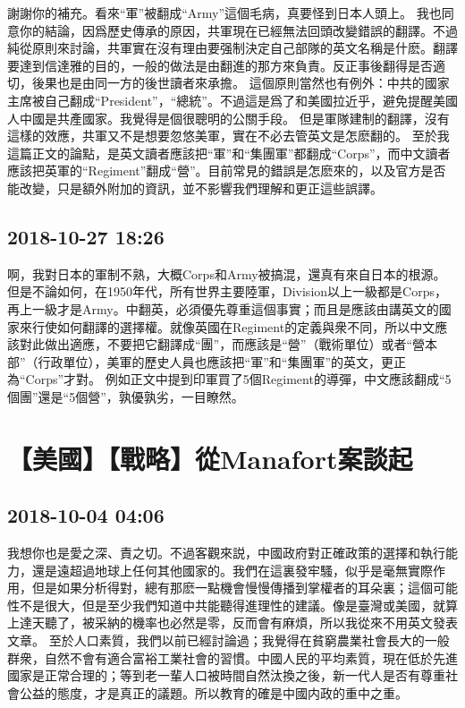 \documentclass[twocolumn]{ctexart}
\begin{document}
謝謝你的補充。看來“軍”被翻成“Army”這個毛病，真要怪到日本人頭上。 
我也同意你的結論，因爲歷史傳承的原因，共軍現在已經無法回頭改變錯誤的翻譯。不過純從原則來討論，共軍實在沒有理由要强制決定自己部隊的英文名稱是什麽。翻譯要達到信達雅的目的，一般的做法是由翻進的那方來負責。反正事後翻得是否適切，後果也是由同一方的後世讀者來承擔。 
這個原則當然也有例外：中共的國家主席被自己翻成“President”，“總統”。不過這是爲了和美國拉近乎，避免提醒美國人中國是共產國家。我覺得是個很聰明的公關手段。 
但是軍隊建制的翻譯，沒有這樣的效應，共軍又不是想要忽悠美軍，實在不必去管英文是怎麽翻的。 
至於我這篇正文的論點，是英文讀者應該把“軍”和“集團軍”都翻成“Corps”，而中文讀者應該把英軍的“Regiment”翻成“營”。目前常見的錯誤是怎麽來的，以及官方是否能改變，只是額外附加的資訊，並不影響我們理解和更正這些誤譯。
\subsection*{2018-10-27 18:26}

啊，我對日本的軍制不熟，大概Corps和Army被搞混，還真有來自日本的根源。 
但是不論如何，在1950年代，所有世界主要陸軍，Division以上一級都是Corps，再上一級才是Army。中翻英，必須優先尊重這個事實；而且是應該由講英文的國家來行使如何翻譯的選擇權。就像英國在Regiment的定義與衆不同，所以中文應該對此做出適應，不要把它翻譯成“團”，而應該是“營”（戰術單位）或者“營本部”（行政單位），美軍的歷史人員也應該把“軍”和“集團軍”的英文，更正為“Corps”才對。 
例如正文中提到印軍買了5個Regiment的導彈，中文應該翻成“5個團”還是“5個營”，孰優孰劣，一目瞭然。
\section*{【美國】【戰略】從Manafort案談起}
\subsection*{2018-10-04 04:06}

我想你也是愛之深、責之切。不過客觀來説，中國政府對正確政策的選擇和執行能力，還是遠超過地球上任何其他國家的。我們在這裏發牢騷，似乎是毫無實際作用，但是如果分析得對，總有那麽一點機會慢慢傳播到掌權者的耳朵裏；這個可能性不是很大，但是至少我們知道中共能聽得進理性的建議。像是臺灣或美國，就算上達天聽了，被采納的機率也必然是零，反而會有麻煩，所以我從來不用英文發表文章。
至於人口素質，我們以前已經討論過；我覺得在貧窮農業社會長大的一般群衆，自然不會有適合富裕工業社會的習慣。中國人民的平均素質，現在低於先進國家是正常合理的；等到老一輩人口被時間自然汰換之後，新一代人是否有尊重社會公益的態度，才是真正的議題。所以教育的確是中國内政的重中之重。
\end{document}
